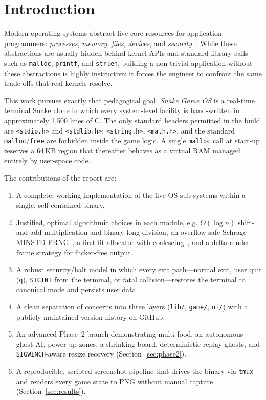 \documentclass[conference]{IEEEtran}
\begin{document}
\section{Introduction}
\label{sec:intro}

Modern operating systems abstract five core resources for application programmers: \textit{processes}, \textit{memory}, \textit{files}, \textit{devices}, and \textit{security}~\cite{silberschatz2018,tanenbaum2014}. While these abstractions are usually hidden behind kernel APIs and standard library calls such as \texttt{malloc}, \texttt{printf}, and \texttt{strlen}, building a non-trivial application without these abstractions is highly instructive: it forces the engineer to confront the same trade-offs that real kernels resolve.

This work pursues exactly that pedagogical goal. \textit{Snake Game OS} is a real-time terminal Snake clone in which every system-level facility is hand-written in approximately 1{,}500 lines of C. The only standard headers permitted in the build are \texttt{<stdio.h>} and \texttt{<stdlib.h>}; \texttt{<string.h>}, \texttt{<math.h>}, and the standard \texttt{malloc}/\texttt{free} are forbidden inside the game logic. A single \texttt{malloc} call at start-up reserves a 64\,KB region that thereafter behaves as a virtual RAM managed entirely by user-space code.

The contributions of the report are:
\begin{enumerate}
    \item A complete, working implementation of the five OS sub-systems within a single, self-contained binary.
    \item Justified, optimal algorithmic choices in each module, e.g. $O(\log n)$ shift-and-add multiplication and binary long-division, an overflow-safe Schrage MINSTD PRNG~\cite{park1988}, a first-fit allocator with coalescing~\cite{knuth1997}, and a delta-render frame strategy for flicker-free output.
    \item A robust security/halt model in which every exit path---normal exit, user quit (\texttt{q}), \texttt{SIGINT} from the terminal, or fatal collision---restores the terminal to canonical mode and persists user data.
    \item A clean separation of concerns into three layers (\texttt{lib/}, \texttt{game/}, \texttt{ui/}) with a publicly maintained version history on GitHub.
    \item An advanced Phase~2 branch demonstrating multi-food, an autonomous ghost AI, power-up zones, a shrinking board, deterministic-replay ghosts, and \texttt{SIGWINCH}-aware resize recovery (Section~\ref{sec:phase2}).
    \item A reproducible, scripted screenshot pipeline that drives the binary via \texttt{tmux} and renders every game state to PNG without manual capture (Section~\ref{sec:results}).
\end{enumerate}
\end{document}
